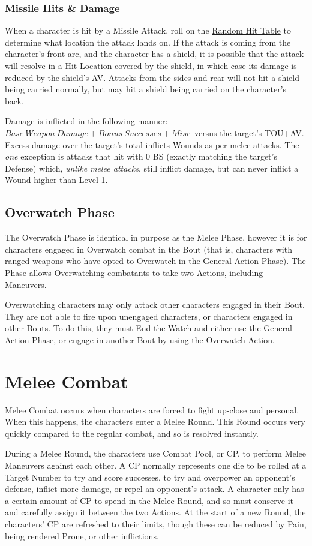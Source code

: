 \documentclass[oneside,11pt,english]{book}
\begin{document}
\subsubsection{Missile Hits \& Damage}
When a character is hit by a Missile Attack, roll on the \hyperref[tab:Missile Target Zones]{Random Hit Table} to determine what location the 
attack lands on. If the attack is coming from the character’s front arc, and the character has a shield, it is possible that the attack will resolve in a Hit Location covered by the shield, in which case its damage is
reduced by the shield’s AV. Attacks from the sides and rear will not hit a shield being carried normally,
but may hit a shield being carried on the character’s back.

Damage is inflicted in the following manner: $ Base~Weapon~Damage+Bonus~Successes+Misc $~versus the target’s TOU+AV. Excess damage over the target’s total inflicts Wounds as-per melee attacks. The \emph{one} exception is attacks that hit with 0 BS (exactly matching the target’s Defense) which, \emph{unlike melee attacks}, still inflict damage, but can never inflict a Wound higher than Level 1.

\subsection{Overwatch Phase}
The Overwatch Phase is identical in purpose as the Melee Phase, however it is for characters engaged in
Overwatch combat in the Bout (that is, characters with ranged weapons who have opted to Overwatch in
the General Action Phase). The Phase allows Overwatching combatants to take two Actions, including
Maneuvers.

Overwatching characters may only attack other characters engaged in their Bout. They are not able to fire
upon unengaged characters, or characters engaged in other Bouts. To do this, they must End the Watch
and either use the General Action Phase, or engage in another Bout by using the Overwatch Action.

\section{Melee Combat}\label{sec:melee-combat}
Melee Combat occurs when characters are forced to fight up-close and personal. When this happens, the characters enter a Melee Round. This Round occurs very quickly compared to the regular combat, and so is resolved instantly.

During a Melee Round, the characters use Combat Pool, or CP, to perform Melee Maneuvers against each other. A CP normally represents one die to be rolled at a Target Number to try and score successes, to try and overpower an opponent’s defense, inflict more damage, or repel an opponent’s attack. A character only has a certain amount of CP to spend in the Melee Round, and so must conserve it and carefully assign it between the two Actions. At the start of a new Round, the characters’ CP are refreshed to their limits, though these can be reduced by Pain, being rendered Prone, or other inflictions.
\end{document}
